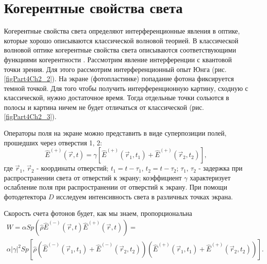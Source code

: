 \section{Когерентные свойства света}
Когерентные свойства света определяют интерференционные явления в
оптике, которые хорошо описываются классической волновой теорией. В
классической волновой оптике когерентные свойства света описываются
соответствующими функциями когерентности
\cite{bAhmanovNikitinPhysicalOptics2004, bMandel2000, bKilinQuantumOptics2003}.
Рассмотрим явление 
интерференции с квантовой точки зрения. Для этого рассмотрим
интерференционный опыт Юнга (рис.\ref{figPart4Ch2_2}). На экране (фотопластинке)
попадание фотона фиксируется темной точкой. Для того чтобы получить
интерференционную картину, сходную с классической, нужно достаточное
время. Тогда отдельные точки сольются в полосы и картина ничем не
будет отличаться от классической (рис.\ref{figPart4Ch2_3}). 





Операторы поля на экране можно представить в виде суперпозиции полей,
прошедших через отверстия 1, 2:
\begin{equation}
\hat{E}^{(+)}\left(\vec{r}, t\right) = 
\gamma \left[ 
\hat{E}^{(+)}\left(\vec{r}_1, t_1\right) +
\hat{E}^{(+)}\left(\vec{r}_2, t_2\right)
\right],
\label{eqCh4_11}
\end{equation}
где $\vec{r}_1$, $\vec{r}_2$ - координаты отверстий;  $t_1 = t -
\tau_1$,  $t_2 = t - \tau_2$;  $\tau_1$, $\tau_2$ - задержка при
распространении света от отверстий к экрану; коэффициент $\gamma$
характеризует ослабление поля при распространении от отверстий к
экрану. При помощи фотодетектора $D$ исследуем интенсивность света в
различных точках экрана.  

Скорость счета фотонов будет, как мы знаем, пропорциональна
\begin{eqnarray}
W = 
\alpha Sp\left(\hat{\rho}\hat{E}^{(-)}\left(\vec{r},
t\right)\hat{E}^{(+)}\left(\vec{r}, t\right)\right) = 
\nonumber \\
\alpha \left|\gamma\right|^2
Sp \left[\hat{\rho}
\left( 
\hat{E}^{(-)}\left(\vec{r}_1, t_1\right) +
\hat{E}^{(-)}\left(\vec{r}_2, t_2\right)
\right)
\left( 
\hat{E}^{(+)}\left(\vec{r}_1, t_1\right) +
\hat{E}^{(+)}\left(\vec{r}_2, t_2\right)
\right)
\right].
\nonumber
\end{eqnarray}

